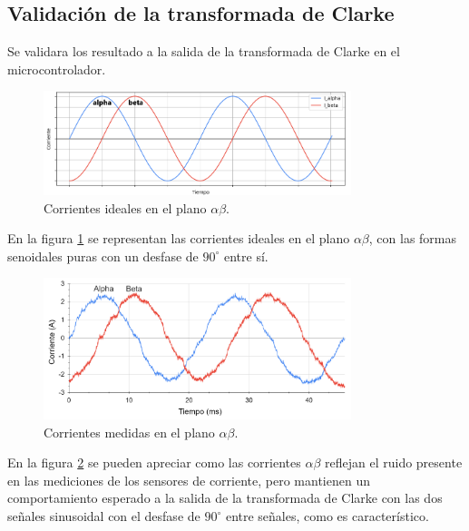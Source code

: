 \documentclass[11pt]{report}
\begin{document}
\newpage
\subsection{Validación de la transformada de Clarke}

Se validara los resultado a la salida de la transformada de Clarke en el microcontrolador.

\begin{figure}[ht]
	\centering
	\includegraphics[width=0.8\textwidth]{imagenes/Corrientes_AlphaBeta_ideal.png}
	\caption{Corrientes ideales en el plano $\alpha\beta$.}
	\label{corrientes_alpha_beta_ideal}
\end{figure}
\FloatBarrier

En la figura \ref{corrientes_alpha_beta_ideal} se representan las corrientes ideales en el plano $\alpha\beta$, con las formas senoidales puras con un desfase de $90^\circ$ entre sí.

\begin{figure}[ht]
	\centering
	\includegraphics[width=0.8\textwidth]{imagenes/Corrientes_AlphaBeta.png}
	\caption{Corrientes medidas en el plano $\alpha\beta$.}
	\label{corrientes_alpha_beta}
\end{figure}
\FloatBarrier

En la figura \ref{corrientes_alpha_beta} se pueden apreciar como las corrientes $\alpha\beta$ reflejan el ruido presente en las mediciones de los sensores de corriente, pero mantienen un comportamiento esperado a la salida de la transformada de Clarke con las dos señales sinusoidal con el desfase de $90^\circ$ entre señales, como es característico.

\newpage
\end{document}
